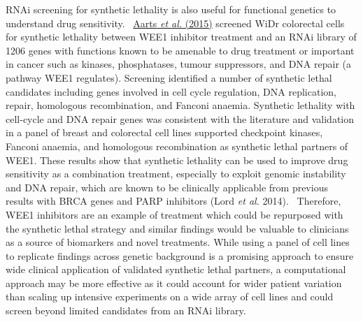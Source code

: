 RNAi screening for synthetic lethality is also useful for functional
genetics to understand drug sensitivity.
\ \hyperlink{ENREF1}{Aarts}\hyperlink{ENREF1}{\textit{ et
al.}}\hyperlink{ENREF1}{ (2015)} screened WiDr colorectal cells for
synthetic lethality between WEE1 inhibitor treatment and an RNAi
library of 1206 genes with functions known to be amenable to drug
treatment or important in cancer such as kinases, phosphatases, tumour
suppressors, and DNA repair (a pathway WEE1 regulates). Screening
identified a number of synthetic lethal candidates including genes
involved in cell cycle regulation, DNA replication, repair, homologous
recombination, and Fanconi anaemia. Synthetic lethality with
cell-cycle and DNA repair genes was consistent with the literature and
validation in a panel of breast and colorectal cell lines supported
checkpoint kinases, Fanconi anaemia, and homologous recombination as
synthetic lethal partners of WEE1. These results show that synthetic
lethality can be used to improve drug sensitivity as a combination
treatment, especially to exploit genomic instability and DNA repair,
which are known to be clinically applicable from previous results with
BRCA genes and PARP inhibitors (Lord\textit{ et al.} 2014).
\ Therefore, WEE1 inhibitors are an example of treatment which could be
repurposed with the synthetic lethal strategy and similar findings
would be valuable to clinicians as a source of biomarkers and novel
treatments. While using a panel of cell lines to replicate findings
across genetic background is a promising approach to ensure wide
clinical application of validated synthetic lethal partners, a
computational approach may be more effective as it could account for
wider patient variation than scaling up intensive experiments on a wide
array of cell lines and could screen beyond limited candidates from an
RNAi library. 


